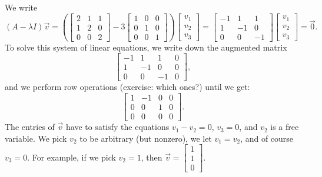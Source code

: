 \begin{example}
We write
\begin{equation*}
(A-\lambda I) \vec{v} = 
\left(
\begin{bmatrix}
2 & 1 & 1 \\
1 & 2 & 0 \\
0 & 0 & 2
\end{bmatrix}
- 3
\begin{bmatrix}
1 & 0 & 0 \\
0 & 1 & 0 \\
0 & 0 & 1
\end{bmatrix}
\right)
\begin{bmatrix}
v_1 \\ v_2 \\ v_3
\end{bmatrix}
=
\begin{bmatrix}
-1 & 1 & 1 \\
1 & -1 & 0 \\
0 & 0 & -1
\end{bmatrix}
\begin{bmatrix}
v_1 \\ v_2 \\ v_3
\end{bmatrix}
=
\vec{0} .
\end{equation*}
To solve this 
system of linear equations,
we write down the
augmented matrix
\begin{equation*}
\left[
\begin{array}{ccc|c}
-1 & 1 & 1 & 0 \\
1 & -1 & 0 & 0 \\
0 & 0 & -1 & 0
\end{array}
\right] ,
\end{equation*}
and we perform row operations (exercise: which ones?) until we get:
\begin{equation*}
\left[
\begin{array}{ccc|c}
1 & -1 & 0 & 0 \\
0 & 0 & 1 & 0 \\
0 & 0 & 0 & 0
\end{array}
\right] .
\end{equation*}
The entries of $\vec{v}$ have to satisfy the equations
$v_1 - v_2 = 0$, $v_3 = 0$, and $v_2$ is a free variable.  
We pick $v_2$ to be arbitrary (but nonzero), we let
$v_1 = v_2$, and of course $v_3 = 0$.
For example, if we pick $v_2 = 1$, then
$\vec{v} =
\left[ \begin{smallmatrix} 1 \\ 1 \\ 0 \end{smallmatrix} \right]$.

\end{example}

